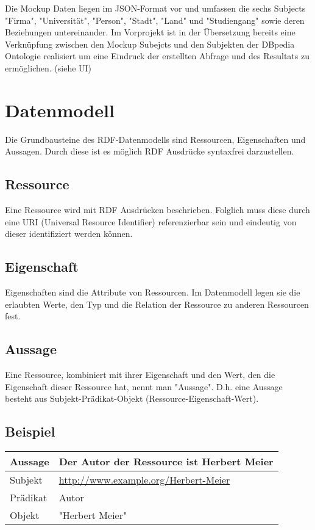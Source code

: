 Die Mockup Daten liegen im JSON-Format vor und umfassen die sechs Subjects "Firma", "Universität", "Person", "Stadt", "Land" und "Studiengang" sowie deren Beziehungen untereinander.
Im Vorprojekt ist in der Übersetzung bereits eine Verknüpfung zwischen den Mockup Subejcts und den Subjekten der DBpedia Ontologie realisiert um eine Eindruck der erstellten Abfrage und des Resultats zu ermöglichen. (siehe UI)

\section{Datenmodell}

Die Grundbausteine des RDF-Datenmodells sind Ressourcen, Eigenschaften und Aussagen. Durch diese ist es möglich RDF Ausdrücke syntaxfrei darzustellen.

\subsection*{Ressource}

Eine Ressource wird mit RDF Ausdrücken beschrieben. Folglich muss diese durch eine URI (Universal Resource Identifier) referenzierbar sein und eindeutig von dieser identifiziert werden können.

\subsection*{Eigenschaft}

Eigenschaften sind die Attribute von Ressourcen. Im Datenmodell legen sie die erlaubten Werte, den Typ und die Relation der Ressource zu anderen Ressourcen fest.

\subsection*{Aussage}

Eine Ressource, kombiniert mit ihrer Eigenschaft und den Wert, den die Eigenschaft dieser Ressource hat, nennt man "Aussage". D.h. eine Aussage besteht aus Subjekt-Prädikat-Objekt (Ressource-Eigenschaft-Wert).

\subsection*{Beispiel}

\begin{tabular}{l l}
Aussage  & Der Autor der Ressource ist Herbert Meier \\\midrule
Subjekt  & \url{http://www.example.org/Herbert-Meier} \\
Prädikat & Autor \\
Objekt   & "Herbert Meier"
\end{tabular}

